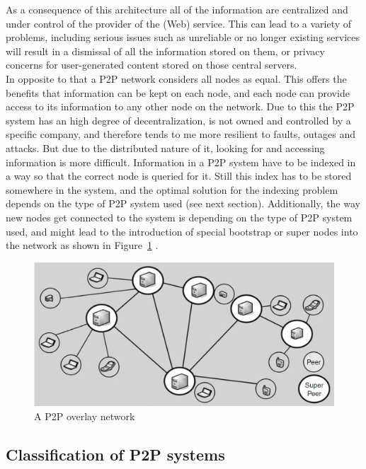 As a consequence of this architecture all of the information are centralized and under control of the provider of the (Web) service. This can lead to a variety of problems, including serious issues such as unreliable or no longer existing services will result in a dismissal of all the information stored on them, or privacy concerns for user-generated content stored on those central servers. \\

In opposite to that a \gls{P2P} network considers all nodes as equal. This offers the benefits that information can be kept on each node, and each node can provide access to its information to any other node on the network. Due to this the \gls{P2P} system has an high degree of decentralization, is not owned and controlled by a specific company, and therefore tends to me more resilient to faults, outages and attacks. But due to the distributed nature of it, looking for and accessing information is more difficult. Information in a \gls{P2P} system have to be indexed in a way so that the correct node is queried for it. Still this index has to be stored somewhere in the system, and the optimal solution for the indexing problem depends on the type of \gls{P2P} system used (see next section). Additionally, the way new nodes get connected to the system is depending on the type of \gls{P2P} system used, and might lead to the introduction of special bootstrap or super nodes into the network as shown in Figure~\ref{fig:p2p_overlay_network} \citep{parameswaran2001p2p}.

\begin{figure}[H]
	\centering
		\includegraphics[width=0.8\columnwidth]{images/p2p_network.png}
	\caption[A \gls{P2P} overlay network]{A \gls{P2P} overlay network \citep[pg. 9]{buford2009p2p}}
\label{fig:p2p_overlay_network}
\end{figure}


\subsection{Classification of \gls{P2P} systems}
\label{sec:p2p_classification}

